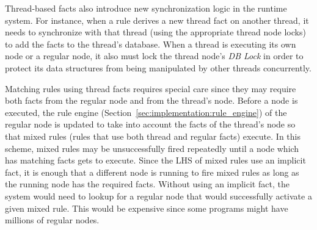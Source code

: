\begin{figure}
\begin{algorithm}[H]
\end{algorithm}
\label{alg:threads:work_loop}
\end{figure}

Thread-based facts also introduce new synchronization logic in the runtime
system. For instance, when a rule derives a new thread fact on another thread,
it needs to synchronize with that thread (using the appropriate thread node
locks) to add the facts to the thread's database. When a thread is executing its
own node or a regular node, it also must lock the thread node's \emph{DB Lock}
in order to protect its data structures from being manipulated by other threads
concurrently.

Matching rules using thread facts requires special care since they may require
both facts from the regular node and from the thread's node. Before a node is
executed, the rule engine (Section~\ref{sec:implementation:rule_engine}) of the
regular node is updated to take into account the facts of the thread's node so
that mixed rules (rules that use both thread and regular facts) execute. In this
scheme, mixed rules may be unsuccessfully fired repeatedly until a node which
has matching facts gets to execute. Since the LHS of mixed rules use an implicit
 fact, it is enough that a different node is running
to fire mixed rules as long as the running node has the required facts.
Without using an implicit  fact, the system would need to lookup
for a regular node that would successfully activate a given mixed rule. This
would be expensive since some programs might have millions of regular nodes.
